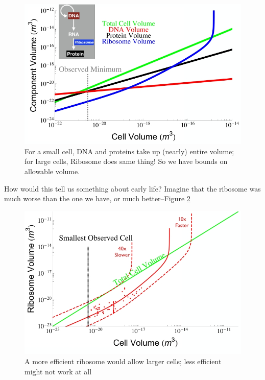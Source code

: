 \documentclass[]{article}
\begin{document}
\begin{figure}[H]
	\caption[Ribosome Tradeoffs]{For a small cell, DNA and proteins take up (nearly) entire volume; for large cells, Ribosome does same thing! So we have bounds on allowable volume.\cite{kempes2016evolutionary}}\label{fig:RibosomeTradeoffs} 
	\includegraphics[width=\textwidth]{RibosomeTradeoffs}
\end{figure}

How would this tell us something about early life? Imagine that the ribosome was much worse than the one we have, or much better--Figure \ref{fig:RibosomeTradeoffsEarly}

\begin{figure}[H]
	\caption[Efficiency of ribosome]{A more efficient ribosome would allow larger cells; less efficient might not work at all\cite{kempes2016evolutionary}}\label{fig:RibosomeTradeoffsEarly} 
	\includegraphics[width=\textwidth]{RibosomeTradeoffsEarly}
\end{figure}
\end{document}
